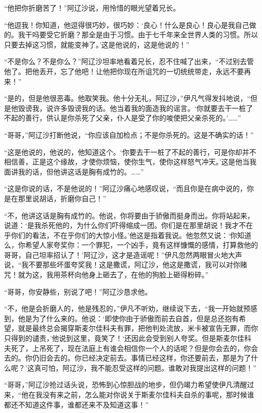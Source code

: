 \par “他把你折磨苦了！”阿辽沙说，用怜惜的眼光望着兄长。
\par “他逗我！你知道，他逗得很巧妙，很巧妙：‘良心！什么是良心！良心是我自己做的。我干吗要受它折磨？那全是由于习惯。由于七千年来全世界人类的习惯。所以只要去掉这习惯，就能变神了。’这是他说的，这是他说的！”
\par “不是你么？不是你么？”阿辽沙坦率地看着兄长，忍不住喊了出来，“不过别去管他了。把他丢开，忘了他吧！让他把你现在所诅咒的一切统统带走，永远不要再来！”
\par “是的，但是他很恶毒。他取笑我。他十分无礼，阿辽沙，”伊凡气得发抖地说，“但是他毁谤我，说许多毁谤我的话。他当着我的面造我的谣言。‘你就要去干一桩了不起的善行，供认是你杀死了父亲，仆人是受了你的唆使把父亲杀死的。’……”
\par “哥哥，”阿辽沙打断他说，“你应该自加检点；不是你杀死的。这是不确实的话！”
\par “这是他说的，他说的，他知道这个。‘你要去干一桩了不起的善行，可是你却并不相信善，正是这个缘故，才使你烦恼，使你生气，使你这样怒气冲天。’这是他当我面讲我的话，但他讲这话是胸有成竹的。……”
\par “这是你说的话，不是他说的！”阿辽沙痛心地感叹说，“而且你是在病中说的，你是在那里说胡话，折磨你自己！”
\par “不，他讲这话是胸有成竹的。他说，你将要由于骄傲而挺身而出。你将站起来，说道：‘是我杀死他的，为什么你们吓得缩成一团。你们是在那里胡说！我才不在乎你们的看法，不在乎你们的大惊小怪。’他这是指着我说。他忽然又说：‘你知道么，你希望人家夸奖你：一个罪犯，一个凶手，竟有这样慷慨的感情，打算救他的哥哥，自己坦率招认了！’阿辽沙，这才是造谣呢！”伊凡忽然两眼冒火地大声说，“我不要那些坏蛋夸奖我！这是撒谎，阿辽沙，他这是撒谎，我可以对你赌咒！就为这，我用茶杯向他身上砸去了，在他的狗脸上砸得粉碎。”
\par “哥哥，你安静些，别说了吧！”阿辽沙恳求他。
\par “不，他是会折磨人的，他是残忍的，”伊凡不听劝，继续说下去，“我一开始就预感到，他是为了什么来的。他说：‘即使你由于骄傲而前去自首，但是总还抱有希望，就是最终总会揭穿斯麦尔佳科夫有罪，把他判处流放，米卡被宣告无罪，而你只得到的谴责，’他说到这里，竟笑了！‘还因此会受到别人夸奖。但是斯麦尔佳科夫死了，上吊死了，现在法庭上有谁会相信你一个人的话呢？但是你会去的，你会去的。你仍旧会去的。你已经决定前去。事情已经这样，你还要前去，那是为了什么呢？’这真可怕，阿辽沙，我不能忍受这样的问题。谁敢对我提出这样的问题！”
\par “哥哥，”阿辽沙抢过话头说，恐怖到心惊胆战的地步，但仍竭力希望使伊凡清醒过来，“他在我没有来之前，怎么能对你说关于斯麦尔佳科夫自杀的事呢，那时候谁都还不知道这件事，谁都还来不及知道这事！”

